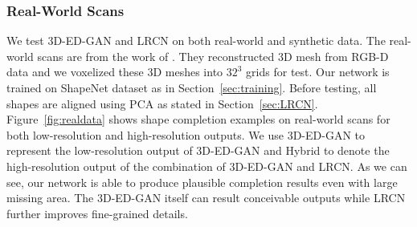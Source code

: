 \documentclass[10pt,twocolumn,letterpaper]{article}
\begin{document}
\subsubsection{Real-World Scans}
We test 3D-ED-GAN and LRCN on both real-world and synthetic data. The real-world scans are from the work of \cite{qimultiview}. They reconstructed 3D mesh from RGB-D data and we voxelized these 3D meshes into $32^3$ grids for test. Our network is trained on ShapeNet dataset as in Section~\ref{sec:training}. Before testing, all shapes are aligned using PCA as stated in Section~\ref{sec:LRCN}. Figure~\ref{fig:realdata} shows shape completion examples on real-world scans for both low-resolution and high-resolution outputs. We use 3D-ED-GAN to represent the low-resolution output of 3D-ED-GAN and Hybrid to denote the high-resolution output of the combination of 3D-ED-GAN and LRCN. As we can see, our network is able to produce plausible completion results even with large missing area. The 3D-ED-GAN itself can result conceivable outputs while LRCN further improves fine-grained details.
\end{document}
